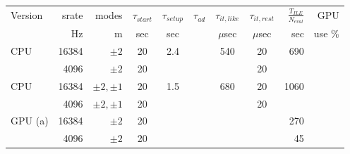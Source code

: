 \documentclass[twocolumn,prd,nofootinbib]{revtex4}
\begin{document}
\begin{table}
\begin{tabular}{lrr|ccccc|rr}
Version & srate & modes & $\tau_{start}$ & $\tau_{setup}$ & $\tau_{ad}$ & $\tau_{it,like}$ &$\tau_{it,rest}$ &
$\frac{T_{ILE}}{N_{eval}}$ & GPU \\  %
  &   Hz & m & sec & sec & & $\mu$sec & $\mu$sec  &sec  & use  \%\\ \hline 
CPU & 16384 & $\pm 2 $ & 20 & 2.4 &&540 & 20 &  690  \\ 
       & 4096 & $\pm 2 $ &   20  &&&& 20 \\ \hline
%    
CPU & 16384 & $\pm 2,\pm 1 $ & 20 & 1.5 && 680 & 20 &  1060  \\ 
       & 4096 & $ \pm 2, \pm 1 $ &   20 &&&& 20  \\ \hline
GPU (a) & 16384 & $\pm 2 $  & 20  & & && & 270 \\
            & 4096 &$\pm 2 $  &  20 &  & & & & 45 \\ \hline

\end{tabular}
\end{table}
\end{document}

